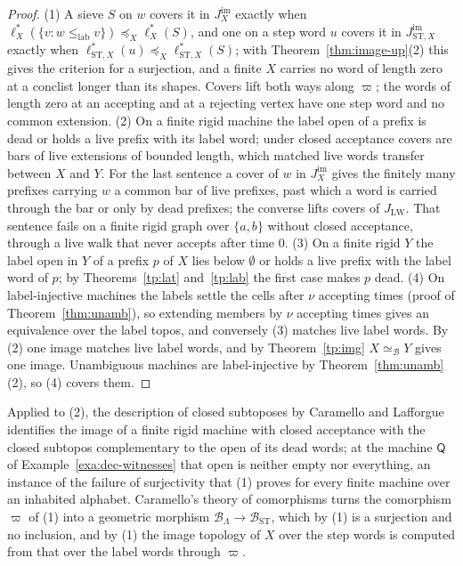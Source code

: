 \documentclass{lmcs}
\theoremstyle{definition}
\theoremstyle{remark}
\newcommand{\ab}{\{a,b\}}
\newcommand{\JLW}{J_{\LW}}
\newcommand{\fle}[1]{\preceq_{#1}}
\newcommand{\lle}{\leq_{\mathrm{lab}}}
\newcommand{\LW}{\mathrm{LW}}
\providecommand{\wQ}{\mathsf{Q}}
\providecommand{\BL}{\mathcal{B}_{\Lambda}}
\providecommand{\BST}{\mathcal{B}_{\mathrm{ST}}}
\providecommand{\fgt}{\varpi}
\providecommand{\lsts}[1]{\ell^{*}_{\mathrm{ST},#1}}
\providecommand{\JimS}[1]{J^{\mathrm{im}}_{\mathrm{ST},#1}}
\providecommand{\eqB}{\simeq_{\mathcal{B}}}
\providecommand{\lst}[1]{\ell^{*}_{#1}}
\providecommand{\Jim}[1]{J^{\mathrm{im}}_{#1}}
\providecommand{\wQ}{\mathsf{Q}}
\begin{document}
\begin{proof}
(1) A sieve $S$ on $w$ covers it in $\Jim{X}$ exactly when $\lst{X}(\{v : w\lle v\})\fle{X}\lst{X}(S)$, and one
on a step word $u$ covers it in $\JimS{X}$ exactly when $\lsts{X}(u)\fle{X}\lsts{X}(S)$; with
Theorem~\ref{thm:image-up}(2) this gives the criterion for a surjection, and
a finite $X$ carries no word of length zero at a conclist longer than its
shapes.
Covers lift both ways along $\fgt$; the
words of length zero at an accepting and at a rejecting vertex have one step word and no common
extension.
(2) On a finite rigid machine the label open of a prefix is dead or holds a live prefix with its label
word; under closed
acceptance covers are bars of live extensions of bounded length, which matched live words transfer between $X$ and
$Y$.
For the last sentence a cover of $w$ in $\Jim{X}$ gives the finitely many prefixes carrying $w$ a common bar of
live prefixes, past which a word is carried through the bar or only by dead prefixes; the converse lifts covers
of $\JLW$.
That sentence fails on a finite rigid graph over $\ab$ without closed acceptance, through a live walk that never accepts
after time $0$.
(3) On a finite rigid $Y$ the label open in $Y$ of a prefix $p$ of $X$ lies below $\emptyset$ or holds a live prefix
with the label word of $p$; by Theorems~\ref{tp:lat} and~\ref{tp:lab} the first case
makes $p$ dead.
(4) On label-injective machines the
labels settle the cells after $\nu$ accepting times (proof of Theorem~\ref{thm:unamb}), so extending members by $\nu$
accepting times gives an equivalence over the label topos, and conversely (3) matches live label
words.
By (2) one image matches live label words, and by Theorem~\ref{tp:img} $X\eqB Y$ gives one
image.
Unambiguous machines are label-injective by Theorem~\ref{thm:unamb}(2),
so (4) covers them.
\end{proof}

Applied to (2), the description of closed subtoposes by Caramello and Lafforgue
\cite{CL25b} identifies the image of a finite
rigid machine with closed acceptance with the closed subtopos complementary to the open of its dead words;
at the machine $\wQ$ of Example~\ref{exa:dec-witnesses} that open is neither empty nor everything, an instance of
the failure of surjectivity that (1) proves for every finite machine over an inhabited alphabet. Caramello's theory of
comorphisms \cite{Caramello19} turns the comorphism $\fgt$ of (1) into a
geometric morphism $\BL\to\BST$, which by (1) is a surjection and no inclusion, and by (1) the image topology of $X$
over the step words is computed from that over the label words through $\fgt$.
\end{document}

